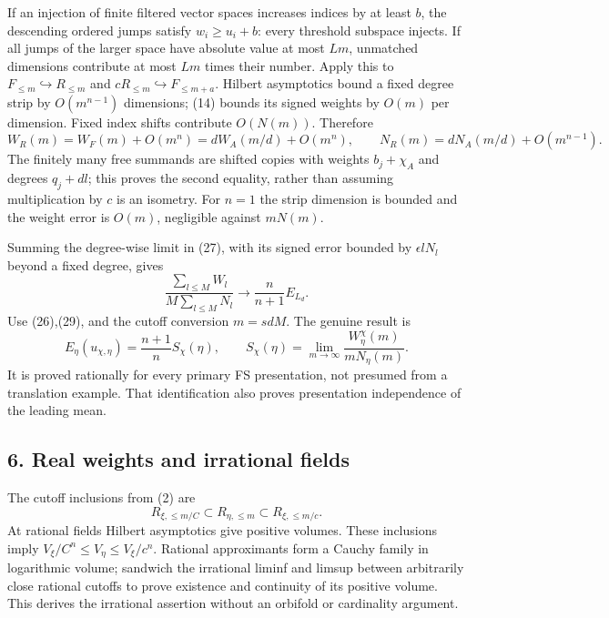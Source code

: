 \documentclass[
  10pt,
]{article}
\begin{document}
If an injection of finite filtered vector spaces increases indices by at
least \(b\), the descending ordered jumps satisfy \(w_i\geq u_i+b\):
every threshold subspace injects. If all jumps of the larger space have
absolute value at most \(Lm\), unmatched dimensions contribute at most
\(Lm\) times their number. Apply this to
\(F_{\leq m}\hookrightarrow R_{\leq m}\) and
\(cR_{\leq m}\hookrightarrow F_{\leq m+a}\). Hilbert asymptotics bound a
fixed degree strip by \(O(m^{n-1})\) dimensions; (14) bounds its signed
weights by \(O(m)\) per dimension. Fixed index shifts contribute
\(O(N(m))\). Therefore
\[ W_R(m)=W_F(m)+O(m^n)=dW_A(m/d)+O(m^n),\qquad N_R(m)=dN_A(m/d)+O(m^{n-1}).                      \tag{29}\]
The finitely many free summands are shifted copies with weights
\(b_j+\chi_A\) and degrees \(q_j+d l\); this proves the second equality,
rather than assuming multiplication by \(c\) is an isometry. For \(n=1\)
the strip dimension is bounded and the weight error is \(O(m)\),
negligible against \(mN(m)\).

Summing the degree-wise limit in (27), with its signed error bounded by
\(\epsilon lN_l\) beyond a fixed degree, gives
\[ \frac{\sum_{l\leq M}W_l}{M\sum_{l\leq M}N_l}\longrightarrow\frac n{n+1}E_{L_d}. \]
Use (26),(29), and the cutoff conversion \(m=sdM\). The genuine result
is \[ \boxed{ E_\eta(u_{\chi,\eta})=\frac{n+1}{n}S_\chi(\eta),\qquad
 S_\chi(\eta)=\lim_{m\to\infty}\frac{W_\eta^\chi(m)}{mN_\eta(m)}. }                             \tag{30}\]
It is proved rationally for every primary FS presentation, not presumed
from a translation example. That identification also proves presentation
independence of the leading mean.

\subsection{6. Real weights and irrational
fields}\label{real-weights-and-irrational-fields}

The cutoff inclusions from (2) are
\[ R_{\xi,\leq m/C}\subset R_{\eta,\leq m}\subset R_{\xi,\leq m/c}.                              \tag{31}\]
At rational fields Hilbert asymptotics give positive volumes. These
inclusions imply \(V_\xi/C^n\leq V_\eta\leq V_\xi/c^n\). Rational
approximants form a Cauchy family in logarithmic volume; sandwich the
irrational liminf and limsup between arbitrarily close rational cutoffs
to prove existence and continuity of its positive volume. This derives
the irrational assertion without an orbifold or cardinality argument.
\end{document}
